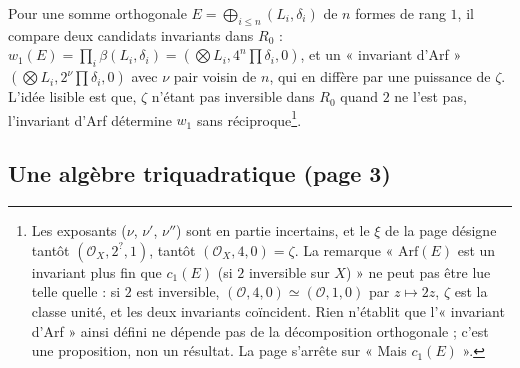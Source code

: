 \documentclass[11pt,a4paper]{article}
\begin{document}
Pour une somme orthogonale $E = \bigoplus_{i \le n}(L_i, \delta_i)$ de $n$ formes de
rang $1$, il compare deux candidats invariants dans $R_0$ :
$w_1(E) = \prod_i \beta(L_i, \delta_i) = (\bigotimes L_i, 4^{n}\prod\delta_i, 0)$, et un
« invariant d'Arf » $(\bigotimes L_i, 2^{\nu}\prod\delta_i, 0)$ avec $\nu$ pair
voisin de $n$, qui en diffère par une puissance de $\zeta$. L'idée lisible est
que, $\zeta$ n'étant pas inversible dans $R_0$ quand $2$ ne l'est pas, l'invariant
d'Arf détermine $w_1$ sans réciproque\footnote{Les exposants ($\nu$, $\nu'$,
$\nu''$) sont en partie incertains, et le $\xi$ de la page désigne tantôt
$(\mathcal{O}_X, 2^{?}, 1)$, tantôt $(\mathcal{O}_X, 4, 0) = \zeta$. La remarque
« $\mathrm{Arf}(E)$ est un invariant plus fin que $c_1(E)$ (si $2$ inversible sur
$X$) » ne peut pas être lue telle quelle : si $2$ est inversible,
$(\mathcal{O}, 4, 0) \simeq (\mathcal{O}, 1, 0)$ par $z \mapsto 2z$, $\zeta$ est la classe
unité, et les deux invariants coïncident. Rien n'établit que l'« invariant d'Arf »
ainsi défini ne dépende pas de la décomposition orthogonale ; c'est une
proposition, non un résultat. La page s'arrête sur « Mais $c_1(E)$ ».}.

\subsection*{Une algèbre triquadratique (page 3)}
\end{document}
